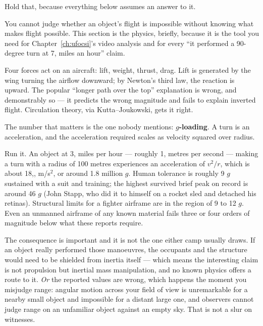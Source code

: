 Hold that, because everything below assumes an answer to it.

You cannot judge whether an object's flight is impossible without knowing what makes flight
possible. This section is the physics, briefly, because it is the tool you need for Chapter~\ref{ch:ufocsi}'s
video analysis and for every ``it performed a 90-degree turn at 7, miles an hour'' claim.

Four forces act on an aircraft: lift, weight, thrust, drag. Lift is generated by the wing turning
the airflow downward; by Newton's third law, the reaction is upward. The popular ``longer path
over the top'' explanation is wrong, and demonstrably so --- it predicts the wrong magnitude and
fails to explain inverted flight. Circulation theory, via Kutta--Joukowski, gets it right.

The number that matters is the one nobody mentions: \textbf{$g$-loading}. A turn is an
acceleration, and the acceleration required scales as velocity squared over radius. 

Run it. An object at 3, miles per hour --- roughly 1, metres per second --- making a
turn with a radius of 100 metres experiences an acceleration of $v^2/r$, which is about
18,, m/s$^2$, or around 1.8 million $g$. Human tolerance is roughly 9 $g$ sustained
with a suit and training; the highest survived brief peak on record is around 46 $g$ (John Stapp,
who did it to himself on a rocket sled and detached his retinas). Structural limits for a fighter
airframe are in the region of 9 to 12 $g$. Even an unmanned airframe of any known material fails
three or four orders of magnitude below what these reports require.

The consequence is important and it is not the one either camp usually draws. If an object really
performed those manoeuvres, the occupants and the structure would need to be shielded from
inertia itself --- which means the interesting claim is not propulsion but inertial mass
manipulation, and no known physics offers a route to it. \emph{Or} the reported values are wrong,
which happens the moment you misjudge range: angular motion across your field of view is
unremarkable for a nearby small object and impossible for a distant large one, and observers
cannot judge range on an unfamiliar object against an empty sky. That is not a slur on witnesses.

